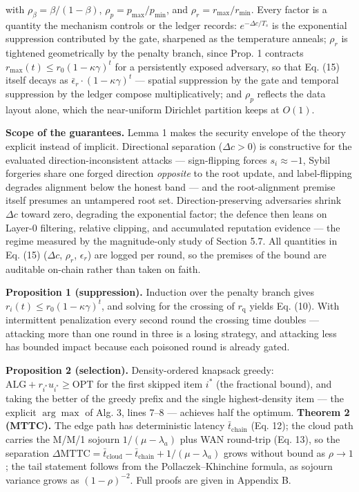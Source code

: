 \documentclass[cmc,article,submit,moreauthors,pdftex]{Definitions/tsp}
\begin{document}
with $\rho_\beta = \beta/(1-\beta)$, $\rho_p = p_{\max}/p_{\min}$, and $\rho_r = r_{\max}/r_{\min}$. Every factor is a quantity the mechanism controls or the ledger records: $e^{-\Delta c/T_s}$ is the exponential suppression contributed by the gate, sharpened as the temperature anneals; $\rho_r$ is tightened geometrically by the penalty branch, since Prop. 1 contracts $r_{\max}(t) \le r_0(1-\kappa\gamma)^t$ for a persistently exposed adversary, so that Eq. (15) itself decays as $\bar\epsilon_r \cdot (1-\kappa\gamma)^t$ --- spatial suppression by the gate and temporal suppression by the ledger compose multiplicatively; and $\rho_p$ reflects the data layout alone, which the near-uniform Dirichlet partition keeps at $O(1)$.

\textbf{Scope of the guarantees.} Lemma 1 makes the security envelope of the theory explicit instead of implicit. Directional separation ($\Delta c > 0$) is constructive for the evaluated direction-inconsistent attacks --- sign-flipping forces $s_i \approx -1$, Sybil forgeries share one forged direction \emph{opposite} to the root update, and label-flipping degrades alignment below the honest band --- and the root-alignment premise itself presumes an untampered root set. Direction-preserving adversaries shrink $\Delta c$ toward zero, degrading the exponential factor; the defence then leans on Layer-0 filtering, relative clipping, and accumulated reputation evidence --- the regime measured by the magnitude-only study of Section 5.7. All quantities in Eq. (15) ($\Delta c$, $\rho_r$, $\epsilon_r$) are logged per round, so the premises of the bound are auditable on-chain rather than taken on faith.

\textbf{Proposition 1 (suppression).} Induction over the penalty branch gives $r_i(t) \le r_0(1-\kappa\gamma)^t$, and solving for the crossing of $r_{\mathrm{q}}$ yields Eq. (10). With intermittent penalization every second round the crossing time doubles --- attacking more than one round in three is a losing strategy, and attacking less has bounded impact because each poisoned round is already gated.

\textbf{Proposition 2 (selection).} Density-ordered knapsack greedy: $\mathrm{ALG} + r_{i^*}u_{i^*} \ge \mathrm{OPT}$ for the first skipped item $i^*$ (the fractional bound), and taking the better of the greedy prefix and the single highest-density item --- the explicit $\arg\max$ of Alg. 3, lines 7--8 --- achieves half the optimum. \textbf{Theorem 2 (MTTC).} The edge path has deterministic latency $\bar{t}_{\mathrm{chain}}$ (Eq. 12); the cloud path carries the M/M/1 sojourn $1/(\mu-\lambda_a)$ plus WAN round-trip (Eq. 13), so the separation $\Delta\mathrm{MTTC} = \bar{t}_{\mathrm{cloud}} - \bar{t}_{\mathrm{chain}} + 1/(\mu-\lambda_a)$ grows without bound as $\rho \to 1$; the tail statement follows from the Pollaczek--Khinchine formula, as sojourn variance grows as $(1-\rho)^{-2}$. Full proofs are given in Appendix B.
\end{document}
